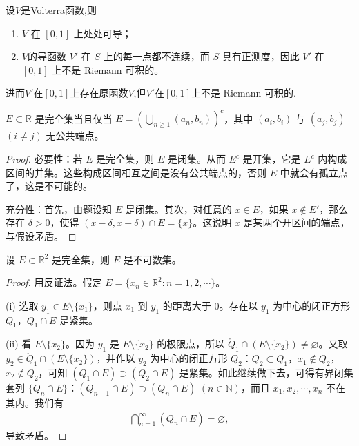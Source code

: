 \documentclass[../../main.tex]{subfiles}%
\begin{document}
\begin{theorem}[Volterra函数的基本性质]\label{theorem:Volterra函数的基本性质}
设$V$是Volterra函数,则
\begin{enumerate}[(1)]
\item \( V \) 在 \( [0,1] \) 上处处可导；
\item \( V \)的导函数 \( V' \) 在 \( S \) 上的每一点都不连续，而 \( S \) 具有正测度，因此 \( V' \) 在 \( [0,1] \) 上不是 Riemann 可积的。
\end{enumerate}
进而$V'$在$[0,1]$上存在原函数$V$,但$V'$在$[0,1]$上不是 Riemann 可积的.
\end{theorem}

\begin{example}
\(E\subset\mathbb{R}\) 是完全集当且仅当 \(E = \left(\bigcup_{n\geqslant 1}(a_n,b_n)\right)^c\)，其中 \((a_i,b_i)\) 与 \((a_j,b_j)\) \((i\neq j)\) 无公共端点。
\end{example}
\begin{proof}

{\heiti 必要性：}若 \(E\) 是完全集，则 \(E\) 是闭集。从而 \(E^c\) 是开集，它是 \(E^c\) 内构成区间的并集。这些构成区间相互之间是没有公共端点的，否则 \(E\) 中就会有孤立点了，这是不可能的。

{\heiti 充分性：}首先，由题设知 \(E\) 是闭集。其次，对任意的 \(x\in E\)，如果 \(x\notin E'\)，那么存在 \(\delta>0\)，使得 \((x - \delta,x + \delta)\cap E = \{x\}\)。这说明 \(x\) 是某两个开区间的端点，与假设矛盾。
\end{proof}

\begin{example}
设 \(E\subset\mathbb{R}^2\) 是完全集，则 \(E\) 是不可数集。
\end{example}
\begin{proof}
用反证法。假定 \(E = \{x_n\in\mathbb{R}^2: n = 1,2,\cdots\}\)。

(i) 选取 \(y_1\in E\setminus\{x_1\}\)，则点 \(x_1\) 到 \(y_1\) 的距离大于 \(0\)。存在以 \(y_1\) 为中心的闭正方形 \(Q_1\)，\(Q_1\cap E\) 是紧集。

(ii) 看 \(E\setminus\{x_2\}\)。因为 \(y_1\) 是 \(E\setminus\{x_2\}\) 的极限点，所以 \(\mathring{Q}_1\cap (E\setminus\{x_2\})\neq\varnothing\)。又取 \(y_2\in\mathring{Q}_1\cap (E\setminus\{x_2\})\)，并作以 \(y_2\) 为中心的闭正方形 \(Q_2\)：\(Q_2\subset Q_1\)，\(x_1\notin Q_2\)，\(x_2\notin Q_2\)，可知 \((Q_1\cap E)\supset (Q_2\cap E)\) 是紧集。如此继续做下去，可得有界闭集套列 \(\{Q_n\cap E\}\)：\((Q_{n - 1}\cap E)\supset (Q_n\cap E)\) \((n\in\mathbb{N})\)，而且 \(x_1,x_2,\cdots,x_n\) 不在其内。我们有
\begin{align*}
\bigcap_{n = 1}^{\infty}(Q_n\cap E)=\varnothing,
\end{align*}
导致矛盾。 
\end{proof}
\end{document}
